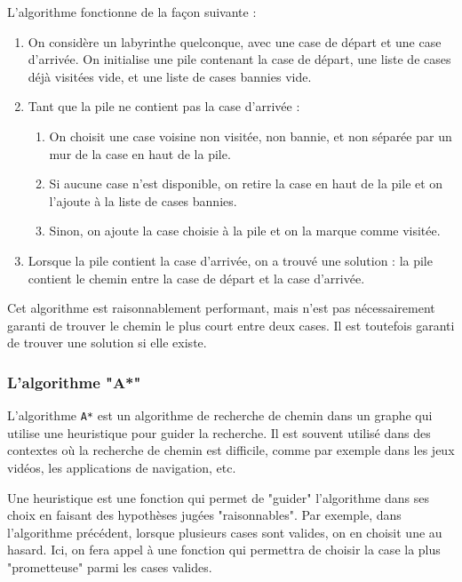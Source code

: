 \documentclass[12pt]{scrreprt} %
\begin{document}
L'algorithme fonctionne de la façon suivante :

\begin{enumerate}
    \item On considère un labyrinthe quelconque, avec une case de départ et une case d'arrivée. On initialise une pile contenant la case de départ, une liste de cases déjà visitées vide, et une liste de cases bannies vide.
    \item Tant que la pile ne contient pas la case d'arrivée :
          \begin{enumerate}
              \item On choisit une case voisine non visitée, non bannie, et non séparée par un mur de la case en haut de la pile.
              \item Si aucune case n'est disponible, on retire la case en haut de la pile et on l'ajoute à la liste de cases bannies.
              \item Sinon, on ajoute la case choisie à la pile et on la marque comme visitée.
          \end{enumerate}

    \item Lorsque la pile contient la case d'arrivée, on a trouvé une solution : la pile contient le chemin entre la case de départ et la case d'arrivée.
\end{enumerate}

Cet algorithme est raisonnablement performant, mais n'est pas nécessairement garanti de trouver le chemin le plus court entre deux cases. Il est toutefois garanti de trouver une solution si elle existe.

\subsubsection{L'algorithme "A*"}

L'algorithme \texttt{A*} est un algorithme de recherche de chemin dans un graphe qui utilise une heuristique pour guider la recherche. Il est souvent utilisé dans des contextes où la recherche de chemin est difficile, comme par exemple dans les jeux vidéos, les applications de navigation, etc.

Une heuristique est une fonction qui permet de "guider" l'algorithme dans ses choix en faisant des hypothèses jugées "raisonnables". Par exemple, dans l'algorithme précédent, lorsque plusieurs cases sont valides, on en choisit une au hasard. Ici, on fera appel à une fonction qui permettra de choisir la case la plus "prometteuse" parmi les cases valides.
\end{document}
